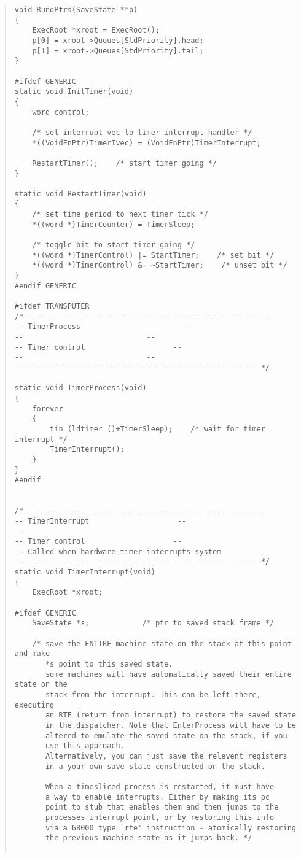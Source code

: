 \begin {quote}
\begin{verbatim}
void RunqPtrs(SaveState **p)
{
    ExecRoot *xroot = ExecRoot();
    p[0] = xroot->Queues[StdPriority].head;
    p[1] = xroot->Queues[StdPriority].tail;
}

#ifdef GENERIC
static void InitTimer(void)
{
    word control;

    /* set interrupt vec to timer interrupt handler */
    *((VoidFnPtr)TimerIvec) = (VoidFnPtr)TimerInterrupt;

    RestartTimer();    /* start timer going */
}

static void RestartTimer(void)
{
    /* set time period to next timer tick */
    *((word *)TimerCounter) = TimerSleep;

    /* toggle bit to start timer going */
    *((word *)TimerControl) |= StartTimer;    /* set bit */
    *((word *)TimerControl) &= ~StartTimer;    /* unset bit */
}
#endif GENERIC

#ifdef TRANSPUTER
/*--------------------------------------------------------
-- TimerProcess                        --
--                            --
-- Timer control                    --
--                            --
--------------------------------------------------------*/
 
static void TimerProcess(void)
{
    forever
    {
        tin_(ldtimer_()+TimerSleep);    /* wait for timer interrupt */
        TimerInterrupt();
    }
}
#endif


/*--------------------------------------------------------
-- TimerInterrupt                    --
--                            --
-- Timer control                    --
-- Called when hardware timer interrupts system        --
--------------------------------------------------------*/
static void TimerInterrupt(void)
{
    ExecRoot *xroot;

#ifdef GENERIC
    SaveState *s;            /* ptr to saved stack frame */

    /* save the ENTIRE machine state on the stack at this point and make
       *s point to this saved state.
       some machines will have automatically saved their entire state on the
       stack from the interrupt. This can be left there, executing
       an RTE (return from interrupt) to restore the saved state
       in the dispatcher. Note that EnterProcess will have to be
       altered to emulate the saved state on the stack, if you
       use this approach.
       Alternatively, you can just save the relevent registers
       in a your own save state constructed on the stack.

       When a timesliced process is restarted, it must have
       a way to enable interrupts. Either by making its pc
       point to stub that enables them and then jumps to the
       processes interrupt point, or by restoring this info
       via a 68000 type `rte' instruction - atomically restoring
       the previous machine state as it jumps back. */


\end{verbatim}
\end{quote}
